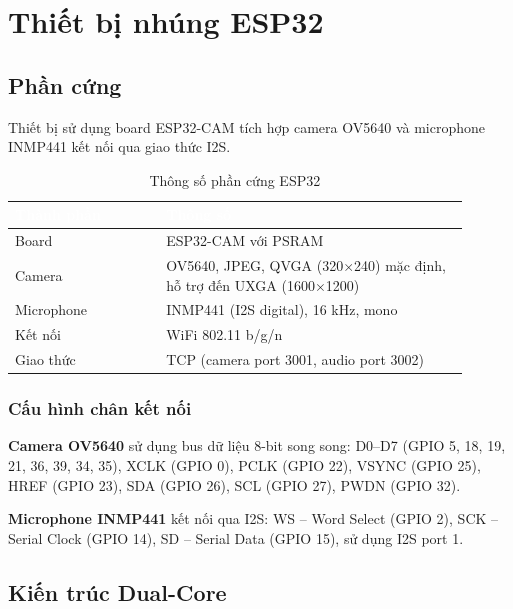 \chapter{Thiết bị nhúng ESP32}

\section{Phần cứng}

Thiết bị sử dụng board ESP32-CAM tích hợp camera OV5640 và microphone INMP441
kết nối qua giao thức I2S.

\begin{table}[htbp]
\centering
\caption{Thông số phần cứng ESP32}
\label{tab:esp32-hardware}
\begin{tabular}{>{\raggedright\arraybackslash}p{0.3\linewidth} >{\raggedright\arraybackslash}p{0.6\linewidth}}
\toprule
\rowcolor{headerblue} \textcolor{white}{\textbf{Thành phần}} & \textcolor{white}{\textbf{Thông số}} \\
\midrule
\rowcolor{rowgray} Board & ESP32-CAM với PSRAM \\
Camera & OV5640, JPEG, QVGA (320$\times$240) mặc định, hỗ trợ đến UXGA (1600$\times$1200) \\
\rowcolor{rowgray} Microphone & INMP441 (I2S digital), 16 kHz, mono \\
Kết nối & WiFi 802.11 b/g/n \\
\rowcolor{rowgray} Giao thức & TCP (camera port 3001, audio port 3002) \\
\bottomrule
\end{tabular}
\end{table}

\subsection{Cấu hình chân kết nối}

\textbf{Camera OV5640} sử dụng bus dữ liệu 8-bit song song:
D0--D7 (GPIO 5, 18, 19, 21, 36, 39, 34, 35), XCLK (GPIO 0), PCLK (GPIO 22),
VSYNC (GPIO 25), HREF (GPIO 23), SDA (GPIO 26), SCL (GPIO 27), PWDN (GPIO 32).

\textbf{Microphone INMP441} kết nối qua I2S:
WS -- Word Select (GPIO 2), SCK -- Serial Clock (GPIO 14), SD -- Serial Data (GPIO 15),
sử dụng I2S port 1.

\section{Kiến trúc Dual-Core}


